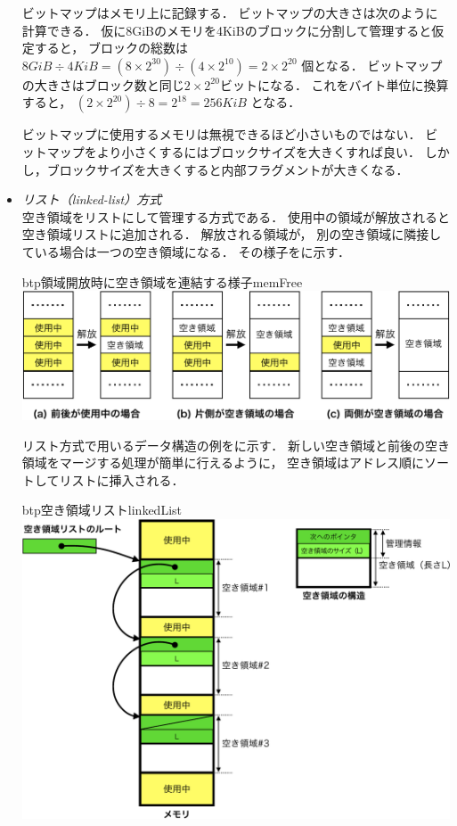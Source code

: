 \begin{itemize}
  ビットマップはメモリ上に記録する．
  ビットマップの大きさは次のように計算できる．
  仮に8GiBのメモリを4KiBのブロックに分割して管理すると仮定すると，
  ブロックの総数は
  $8GiB \div 4KiB = (8\times 2^{30}) \div (4 \times 2^{10}) = 2 \times 2^{20}$
  個となる．
  ビットマップの大きさはブロック数と同じ$2 \times 2^{20}$ビットになる．
  これをバイト単位に換算すると，
  $(2 \times 2^{20}) \div 8 = 2^{18} = 256KiB$
  となる．

  ビットマップに使用するメモリは無視できるほど小さいものではない．
  ビットマップをより小さくするにはブロックサイズを大きくすれば良い．
  しかし，ブロックサイズを大きくすると内部フラグメントが大きくなる．

\item \emph{リスト（linked-list）方式}\\
  空き領域をリストにして管理する方式である．
  使用中の領域が解放されると空き領域リストに追加される．
  解放される領域が，
  別の空き領域に隣接している場合は一つの空き領域になる．
  その様子をに示す．

  \begin{myfig}{btp}{領域開放時に空き領域を連結する様子}{memFree}
    \includegraphics[scale=0.66]{Fig/memFree-crop.pdf}
  \end{myfig}

  リスト方式で用いるデータ構造の例をに示す．
  新しい空き領域と前後の空き領域をマージする処理が簡単に行えるように，
  空き領域はアドレス順にソートしてリストに挿入される．

  \begin{myfig}{btp}{空き領域リスト}{linkedList}
    \includegraphics[scale=0.5]{Fig/linkedList-crop.pdf}
  \end{myfig}


\end{itemize}
